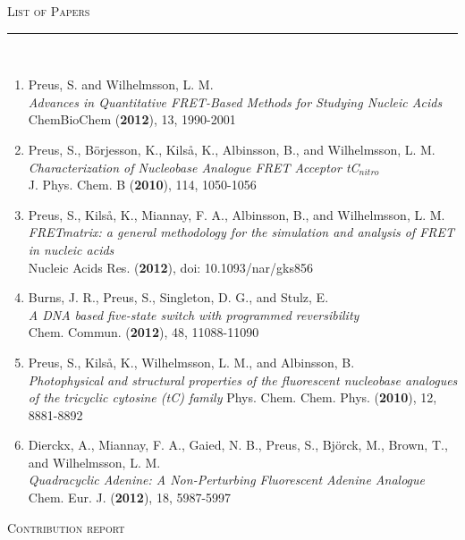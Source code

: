 \thispagestyle{empty}
\hfill\Huge\textsc{List of Papers}\\
\normalsize
\noindent\rule[2pt]{\textwidth}{0.8pt}\\

\begin{enumerate}[I]
  \item Preus, S. and Wilhelmsson, L. M.\\
  \textit{Advances in Quantitative FRET-Based Methods for Studying Nucleic Acids}\\
  ChemBioChem (\textbf{2012}), 13, 1990-2001
  \item Preus, S., Börjesson, K., Kilså, K., Albinsson, B., and Wilhelmsson, L. M.\\
  \textit{Characterization of Nucleobase Analogue FRET Acceptor tC$_{nitro}$\\}
  J. Phys. Chem. B (\textbf{2010}), 114, 1050-1056
  \item Preus, S., Kilså, K., Miannay, F. A., Albinsson, B., and Wilhelmsson, L. M.\\
  \textit{FRETmatrix: a general methodology for the simulation and analysis of FRET in nucleic acids}\\
  Nucleic Acids Res. (\textbf{2012}), doi: 10.1093/nar/gks856
  \item Burns, J. R., Preus, S., Singleton, D. G., and Stulz, E.\\
  \textit{A DNA based five-state switch with programmed reversibility}\\
  Chem. Commun. (\textbf{2012}), 48, 11088-11090
  \item Preus, S., Kilså, K., Wilhelmsson, L. M., and Albinsson, B.\\
  \textit{Photophysical and structural properties of the fluorescent nucleobase analogues of the tricyclic cytosine (tC) family}
  Phys. Chem. Chem. Phys. (\textbf{2010}), 12, 8881-8892
  \item Dierckx, A., Miannay, F. A., Gaied, N. B., Preus, S., Björck, M., Brown, T., and Wilhelmsson, L. M.\\
  \textit{Quadracyclic Adenine: A Non-Perturbing Fluorescent Adenine Analogue\\}
  Chem. Eur. J. (\textbf{2012}), 18, 5987-5997
\end{enumerate}

\vfill
\Large\textsc{Contribution report}\normalsize

